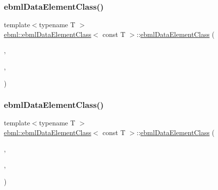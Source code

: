 \subsubsection{\texorpdfstring{ebml\+Data\+Element\+Class()}{ebmlDataElementClass()}\hspace{0.1cm}{\footnotesize\ttfamily [5/6]}}
{\footnotesize\ttfamily template$<$typename T $>$ \\
\mbox{\hyperlink{classebml_1_1ebmlDataElementClass}{ebml\+::ebml\+Data\+Element\+Class}}$<$ const T $>$\+::\mbox{\hyperlink{classebml_1_1ebmlDataElementClass}{ebml\+Data\+Element\+Class}} (\begin{DoxyParamCaption}\item[{\mbox{\hyperlink{namespaceebml_a86c5f604ddf12a74aa9812e997a58691}{ebml\+I\+D\+\_\+t}}}]{,  }\item[{const std\+::wstring \&}]{,  }\item[{const T \&}]{ }\end{DoxyParamCaption})}

\mbox{\label{classebml_1_1ebmlDataElementClass_3_01const_01T_01_4_a2b30da4fc5e2e00ee773db25db952704}} 
\subsubsection{\texorpdfstring{ebml\+Data\+Element\+Class()}{ebmlDataElementClass()}\hspace{0.1cm}{\footnotesize\ttfamily [6/6]}}
{\footnotesize\ttfamily template$<$typename T $>$ \\
\mbox{\hyperlink{classebml_1_1ebmlDataElementClass}{ebml\+::ebml\+Data\+Element\+Class}}$<$ const T $>$\+::\mbox{\hyperlink{classebml_1_1ebmlDataElementClass}{ebml\+Data\+Element\+Class}} (\begin{DoxyParamCaption}\item[{\mbox{\hyperlink{namespaceebml_a86c5f604ddf12a74aa9812e997a58691}{ebml\+I\+D\+\_\+t}}}]{,  }\item[{const std\+::wstring \&}]{,  }\item[{T \&\&}]{ }\end{DoxyParamCaption})}



